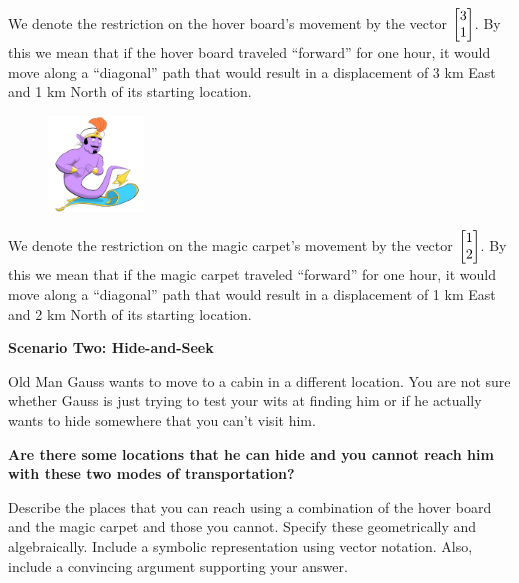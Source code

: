 \begin{iola}
\begin{minipage}{\textwidth}
	We denote the restriction on the hover board's movement by the vector
	$\mat{3 \\1}$. By this we mean that if
	the hover board traveled ``forward'' for one hour, it would move along a
	``diagonal'' path that would result in a displacement of 3 km East and
	1 km North of its starting location.
\end{minipage}

\begin{minipage}{\textwidth}
	\vspace{.5cm}
	\begin{figure}
	\vspace{-.8cm}
	\includegraphics[width=1in]{images/MagicCarpet-small.png}
	\end{figure}

	We denote the restriction on the magic carpet's movement by the vector
	$\mat{1 \\2 }$. By this we mean that if the
	magic carpet traveled ``forward'' for one hour, it would move along a
	``diagonal'' path that would result in a displacement of 1 km East and
	2 km North of its starting location.
	\vspace{1cm}
\end{minipage}



\textbf{Scenario Two: Hide-and-Seek}

Old Man Gauss wants to move to a cabin in a different location. You are
not sure whether Gauss is just trying to test your wits at finding him
or if he actually wants to hide somewhere that you can't visit him.

\vspace{5mm}

\textbf{Are there some locations that he can hide and you cannot reach him
with these two modes of transportation?}

Describe the places that you
can reach using a combination of the hover board and the magic carpet and
those you cannot. Specify these geometrically and algebraically. Include
a symbolic representation using vector notation. Also, include a convincing
argument supporting your answer.

\end{iola}







